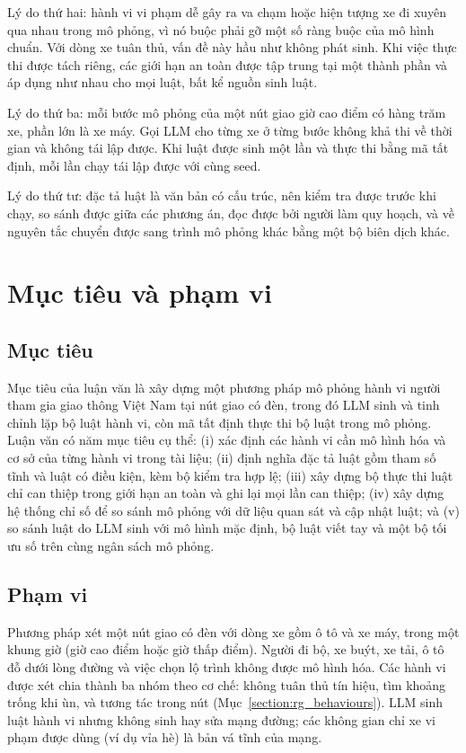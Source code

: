 \documentclass[../main.tex]{subfiles}
\begin{document}
Lý do thứ hai: hành vi vi phạm dễ gây ra va chạm hoặc hiện tượng xe đi xuyên qua nhau trong mô phỏng, vì nó buộc phải gỡ một số ràng buộc của mô hình chuẩn. Với dòng xe tuân thủ, vấn đề này hầu như không phát sinh. Khi việc thực thi được tách riêng, các giới hạn an toàn được tập trung tại một thành phần và áp dụng như nhau cho mọi luật, bất kể nguồn sinh luật.

Lý do thứ ba: mỗi bước mô phỏng của một nút giao giờ cao điểm có hàng trăm xe, phần lớn là xe máy. Gọi LLM cho từng xe ở từng bước không khả thi về thời gian và không tái lập được. Khi luật được sinh một lần và thực thi bằng mã tất định, mỗi lần chạy tái lập được với cùng seed.

Lý do thứ tư: đặc tả luật là văn bản có cấu trúc, nên kiểm tra được trước khi chạy, so sánh được giữa các phương án, đọc được bởi người làm quy hoạch, và về nguyên tắc chuyển được sang trình mô phỏng khác bằng một bộ biên dịch khác.

\section{Mục tiêu và phạm vi}
\label{section:1.2}

\subsection{Mục tiêu}

Mục tiêu của luận văn là xây dựng một phương pháp mô phỏng hành vi người tham gia giao thông Việt Nam tại nút giao có đèn, trong đó LLM sinh và tinh chỉnh lặp bộ luật hành vi, còn mã tất định thực thi bộ luật trong mô phỏng. Luận văn có năm mục tiêu cụ thể: (i) xác định các hành vi cần mô hình hóa và cơ sở của từng hành vi trong tài liệu; (ii) định nghĩa đặc tả luật gồm tham số tĩnh và luật có điều kiện, kèm bộ kiểm tra hợp lệ; (iii) xây dựng bộ thực thi luật chỉ can thiệp trong giới hạn an toàn và ghi lại mọi lần can thiệp; (iv) xây dựng hệ thống chỉ số để so sánh mô phỏng với dữ liệu quan sát và cập nhật luật; và (v) so sánh luật do LLM sinh với mô hình mặc định, bộ luật viết tay và một bộ tối ưu số trên cùng ngân sách mô phỏng.

\subsection{Phạm vi}

Phương pháp xét một nút giao có đèn với dòng xe gồm ô tô và xe máy, trong một khung giờ (giờ cao điểm hoặc giờ thấp điểm). Người đi bộ, xe buýt, xe tải, ô tô đỗ dưới lòng đường và việc chọn lộ trình không được mô hình hóa. Các hành vi được xét chia thành ba nhóm theo cơ chế: không tuân thủ tín hiệu, tìm khoảng trống khi ùn, và tương tác trong nút (Mục~\ref{section:rg_behaviours}). LLM sinh luật hành vi nhưng không sinh hay sửa mạng đường; các không gian chỉ xe vi phạm được dùng (ví dụ vỉa hè) là bản vá tĩnh của mạng.
\end{document}
